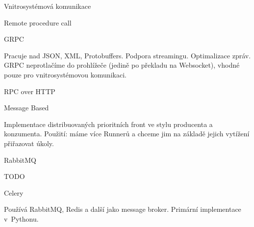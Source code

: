 \sec Vnitrosystémová komunikace

\secc Remote procedure call

\seccc GRPC

Pracuje nad JSON, XML, Protobuffers.
Podpora streamingu.
Optimalizace zpráv.
GRPC neprotlačíme do prohlížeče (jedině po překladu na Websocket), vhodné pouze pro vnitrosystémovou komunikaci.


\seccc RPC over HTTP


\secc Message Based

Implementace distribuovaných prioritních front ve stylu producenta a konzumenta.
Použití: máme více Runnerů a chceme jim na základě jejich vytížení přiřazovat úkoly.

\seccc RabbitMQ

TODO

\secc Celery

Používá RabbitMQ, Redis a další jako message broker. 
Primární implementace v~Pythonu.